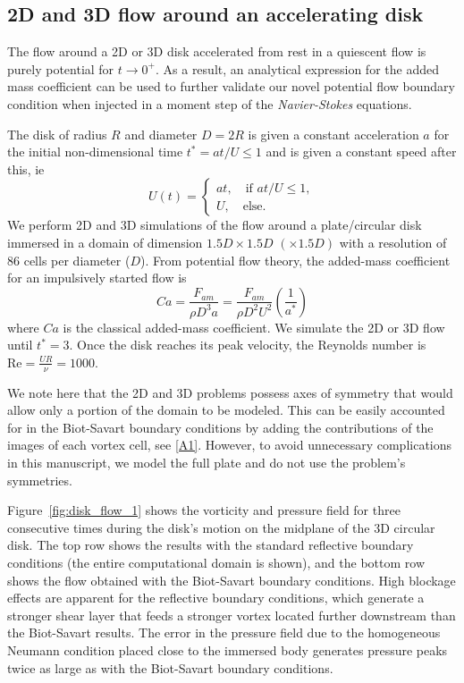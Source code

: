\documentclass[final,1p,times]{elsarticle}
\begin{document}
\subsection{2D and 3D flow around an accelerating disk}

The flow around a 2D or 3D disk accelerated from rest in a quiescent flow is purely potential for $t\to 0^+$. As a result, an analytical expression for the added mass coefficient can be used to further validate our novel potential flow boundary condition when injected in a moment step of the \emph{Navier-Stokes} equations. 

The disk of radius $R$ and diameter $D=2R$ is given a constant acceleration $a$ for the initial non-dimensional time $t^*=at/U\le 1$ and is given a constant speed after this, ie
\begin{equation}
    U(t) = \begin{cases}
        at, \quad \text{if } at/U\le1,\\
        U, \quad \text{else}.
    \end{cases}
\end{equation}
We perform 2D and 3D simulations of the flow around a plate/circular disk immersed in a domain of dimension $1.5D\times1.5D\,\,(\times1.5D)$ with a resolution of 86 cells per diameter ($D$). From potential flow theory, the added-mass coefficient for an impulsively started flow is
\begin{equation}
    Ca  = \frac{F_{am}}{\rho D^3 a} = \frac{F_{am}}{\rho D^2U^2}\left(\frac{1}{a^*}\right) %
\end{equation}
where $Ca$ is the classical added-mass coefficient. We simulate the 2D or 3D flow until $t^*=3$. Once the disk reaches its peak velocity, the Reynolds number is $\text{Re}=\frac{UR}{\nu}=1000$.

We note here that the 2D and 3D problems possess axes of symmetry that would allow only a portion of the domain to be modeled. This can be easily accounted for in the Biot-Savart boundary conditions by adding the contributions of the images of each vortex cell, see \ref{A1}. However, to avoid unnecessary complications in this manuscript, we model the full plate and do not use the problem's symmetries.

Figure~\ref{fig:disk_flow_1} shows the vorticity and pressure field for three consecutive times during the disk's motion on the midplane of the 3D circular disk. The top row shows the results with the standard reflective boundary conditions (the entire computational domain is shown), and the bottom row shows the flow obtained with the Biot-Savart boundary conditions. High blockage effects are apparent for the reflective boundary conditions, which generate a stronger shear layer that feeds a stronger vortex located further downstream than the Biot-Savart results. The error in the pressure field due to the homogeneous Neumann condition placed close to the immersed body generates pressure peaks twice as large as with the Biot-Savart boundary conditions.
\end{document}

